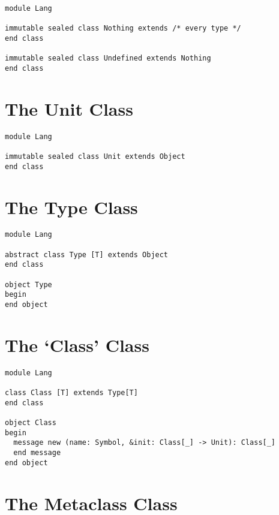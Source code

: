 \begin{lstlisting}
module Lang

immutable sealed class Nothing extends /* every type */
end class

immutable sealed class Undefined extends Nothing
end class
\end{lstlisting}






\section{The Unit Class}
\label{sec:lang-unit}

\begin{lstlisting}
module Lang

immutable sealed class Unit extends Object
end class
\end{lstlisting}






\section{The Type Class}
\label{sec:lang-type}

\begin{lstlisting}
module Lang

abstract class Type [T] extends Object
end class

object Type
begin
end object
\end{lstlisting}







\section{The `Class' Class}
\label{sec:lang-class}

\begin{lstlisting}
module Lang

class Class [T] extends Type[T]
end class

object Class
begin
  message new (name: Symbol, &init: Class[_] -> Unit): Class[_]
  end message
end object
\end{lstlisting}







\section{The Metaclass Class}
\label{sec:lang-metaclass}

